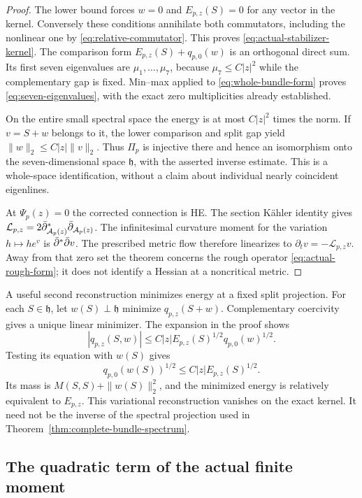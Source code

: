 \begin{proof}
The lower bound forces $w=0$ and $E_{p,z}(S)=0$ for
any vector in the kernel. Conversely these conditions
annihilate both commutators, including the nonlinear
one by \eqref{eq:relative-commutator}. This proves
\eqref{eq:actual-stabilizer-kernel}.
The comparison form $E_{p,z}(S)+q_{p,0}(w)$ is an
orthogonal direct sum. Its first seven eigenvalues are
$\mu_1,\ldots,\mu_7$, because $\mu_7\le C|z|^2$ while
the complementary gap is fixed. Min--max applied to
\eqref{eq:whole-bundle-form} proves
\eqref{eq:seven-eigenvalues}, with the exact zero
multiplicities already established.

On the entire small spectral space the energy is at most
$C|z|^2$ times the norm. If $v=S+w$ belongs to it, the
lower comparison and split gap yield
$\|w\|_2\le C|z|\|v\|_2$. Thus $\Pi_p$ is injective
there and hence an isomorphism onto the seven-dimensional
space $\mathfrak h$, with the asserted inverse estimate.
This is a whole-space identification, without a claim
about individual nearly coincident eigenlines.

At $\Psi_p(z)=0$ the corrected connection is HE.
The section Kähler identity gives
$\mathcal L_{p,z}=2\bar\partial_{\mathcal A_p(z)}^*
\bar\partial_{\mathcal A_p(z)}$. The infinitesimal curvature
moment for the variation $h\mapsto he^v$ is
$\bar\partial^*\bar\partial v$. The prescribed metric flow therefore
linearizes to $\partial_tv=-\mathcal L_{p,z}v$.
Away from that zero set the theorem concerns the rough
operator \eqref{eq:actual-rough-form}; it does not
identify a Hessian at a noncritical metric.
\end{proof}

A useful second reconstruction minimizes energy at a
fixed split projection. For each $S\in\mathfrak h$,
let $w(S)\perp\mathfrak h$ minimize $q_{p,z}(S+w)$.
Complementary coercivity gives a unique linear minimizer.
The expansion in the proof shows
\[
 |q_{p,z}(S,w)|\le C|z|E_{p,z}(S)^{1/2}q_{p,0}(w)^{1/2}.
\]
Testing its equation with $w(S)$ gives
\begin{equation}\label{eq:variational-reconstruction}
 q_{p,0}(w(S))^{1/2}\le C|z|E_{p,z}(S)^{1/2}.
\end{equation}
Its mass is $M(S,S)+\|w(S)\|_2^2$, and the minimized
energy is relatively equivalent to $E_{p,z}$.
This variational reconstruction vanishes on the exact
kernel. It need not be the inverse of the spectral
projection used in Theorem~\ref{thm:complete-bundle-spectrum}.

\subsection{The quadratic term of the actual finite moment}

